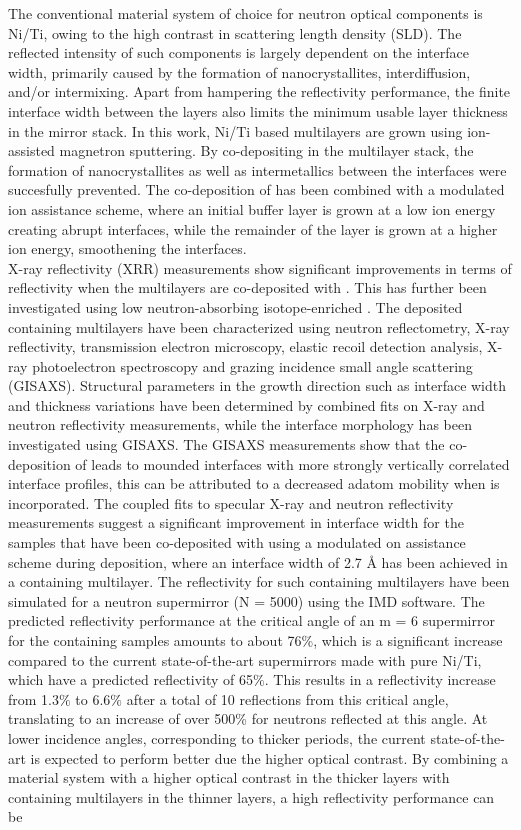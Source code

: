 The conventional material system of choice for neutron optical components is Ni/Ti, owing to the high contrast in scattering length density (SLD). The reflected intensity of such components is largely dependent on the interface width, primarily caused by the  formation of nanocrystallites, interdiffusion, and/or intermixing. Apart from hampering the reflectivity performance, the finite interface width between the layers also limits the minimum usable layer thickness in the mirror stack. In this work, Ni/Ti based multilayers are grown using ion-assisted magnetron sputtering. By co-depositing \natBC in the multilayer stack, the formation of nanocrystallites as well as intermetallics between the interfaces were succesfully prevented. The co-deposition of \natBC has been combined with a modulated ion assistance scheme, where an initial buffer layer is grown at a low ion energy creating abrupt interfaces, while the remainder of the layer is grown at a higher ion energy, smoothening the interfaces. \\ X-ray reflectivity (XRR) measurements show significant improvements in terms of reflectivity when the multilayers are co-deposited with \natBC. This has further been investigated using low neutron-absorbing isotope-enriched \BC. The deposited \BC containing multilayers have been characterized using neutron reflectometry, X-ray reflectivity, transmission electron microscopy, elastic recoil detection analysis, X-ray photoelectron spectroscopy and grazing incidence small angle scattering (GISAXS). Structural parameters in the growth direction such as interface width and thickness variations have been determined by combined fits on X-ray and neutron reflectivity measurements, while the interface morphology has been investigated using GISAXS. The GISAXS measurements show that the co-deposition of \BC leads to mounded interfaces with more strongly vertically correlated interface profiles, this can be attributed to a decreased adatom mobility when \BC is incorporated. The coupled fits to specular X-ray and neutron reflectivity measurements suggest a significant improvement in interface width for the samples that have been co-deposited with \BC using a modulated on assistance scheme during deposition, where an interface width of 2.7 Å has been achieved in a \BC containing multilayer. The reflectivity for such \BC containing multilayers have been simulated for a neutron supermirror (N = 5000) using the IMD software. The predicted reflectivity performance at the critical angle of an m = 6 supermirror for the \BC containing samples amounts to about 76$\%$, which is a significant increase compared to the current state-of-the-art supermirrors made with pure Ni/Ti, which have a predicted reflectivity of 65$\%$. This results in a reflectivity increase from 1.3$\%$ to 6.6$\%$ after a total of 10 reflections from this critical angle, translating to an increase of over 500\% for neutrons reflected at this angle. At lower incidence angles, corresponding to thicker periods, the current state-of-the-art is expected to perform better due the higher optical contrast. By combining a material system with a higher optical contrast in the thicker layers with \BC containing multilayers in the thinner layers, a high reflectivity performance can be 